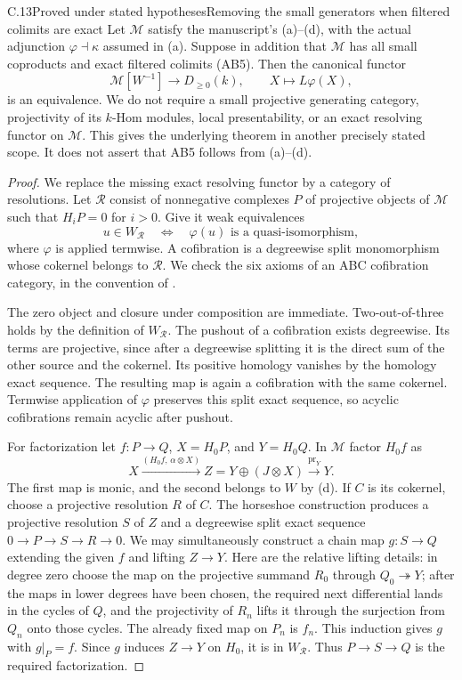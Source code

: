 \begin{claim}{C.13}{Proved under stated hypotheses}{Removing the small generators when filtered colimits are exact}\label{C13}
Let $\mathcal M$ satisfy the manuscript's (a)--(d), with the actual adjunction $\varphi\dashv\kappa$ assumed in (a). Suppose in addition that $\mathcal M$ has all small coproducts and exact filtered colimits (AB5). Then the canonical functor
\[
 \mathcal M[W^{-1}]\longrightarrow D_{\geq0}(k),\qquad X\longmapsto L\varphi(X),
\]
is an equivalence. We do not require a small projective generating category, projectivity of its $k$-Hom modules, local presentability, or an exact resolving functor on $\mathcal M$. This gives the underlying theorem in another precisely stated scope. It does not assert that AB5 follows from (a)--(d).
\end{claim}
\begin{proof}
We replace the missing exact resolving functor by a category of resolutions. Let $\mathcal R$ consist of nonnegative complexes $P$ of projective objects of $\mathcal M$ such that $H_iP=0$ for $i>0$. Give it weak equivalences
\[
 u\in W_{\mathcal R}\quad\Longleftrightarrow\quad
 \varphi(u)\text{ is a quasi-isomorphism},
\]
where $\varphi$ is applied termwise. A cofibration is a degreewise split monomorphism whose cokernel belongs to $\mathcal R$. We check the six axioms of an ABC cofibration category, in the convention of \citet[Definition 1.1.1]{RadulescuBanu2009}.

The zero object and closure under composition are immediate. Two-out-of-three holds by the definition of $W_{\mathcal R}$. The pushout of a cofibration exists degreewise. Its terms are projective, since after a degreewise splitting it is the direct sum of the other source and the cokernel. Its positive homology vanishes by the homology exact sequence. The resulting map is again a cofibration with the same cokernel. Termwise application of $\varphi$ preserves this split exact sequence, so acyclic cofibrations remain acyclic after pushout.

For factorization let $f:P\to Q$, $X=H_0P$, and $Y=H_0Q$. In $\mathcal M$ factor $H_0f$ as
\[
 X\xrightarrow{(H_0f,\,\alpha\otimes X)}
 Z=Y\oplus(J\otimes X)\xrightarrow{\mathrm{pr}_Y}Y.
\]
The first map is monic, and the second belongs to $W$ by (d). If $C$ is its cokernel, choose a projective resolution $R$ of $C$. The horseshoe construction produces a projective resolution $S$ of $Z$ and a degreewise split exact sequence $0\to P\to S\to R\to0$. We may simultaneously construct a chain map $g:S\to Q$ extending the given $f$ and lifting $Z\to Y$. Here are the relative lifting details: in degree zero choose the map on the projective summand $R_0$ through $Q_0\twoheadrightarrow Y$; after the maps in lower degrees have been chosen, the required next differential lands in the cycles of $Q$, and the projectivity of $R_n$ lifts it through the surjection from $Q_n$ onto those cycles. The already fixed map on $P_n$ is $f_n$. This induction gives $g$ with $g|_P=f$. Since $g$ induces $Z\to Y$ on $H_0$, it is in $W_{\mathcal R}$. Thus $P\to S\to Q$ is the required factorization.


\end{proof}

